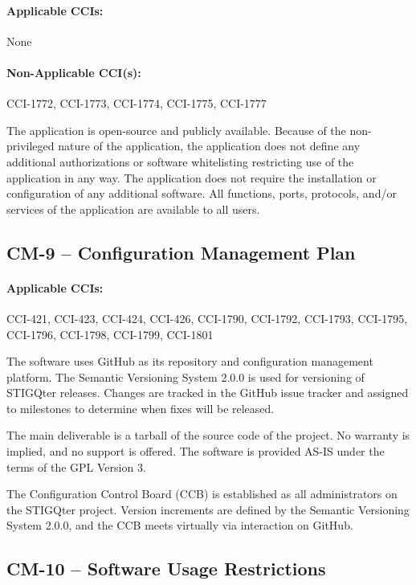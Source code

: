 \documentclass[letterpaper, 10pt, twoside]{article}
\begin{document}
\paragraph{Applicable CCIs:} None

\paragraph{Non-Applicable CCI(s):} CCI-1772, CCI-1773, CCI-1774, CCI-1775, CCI-1777

The application is open-source and publicly available. Because of the non-privileged nature of the application, the application does not define any additional authorizations or software whitelisting restricting use of the application in any way. The application does not require the installation or configuration of any additional software. All functions, ports, protocols, and/or services of the application are available to all users.

\subsection{CM-9 -- Configuration Management Plan}

\paragraph{Applicable CCIs:} CCI-421, CCI-423, CCI-424, CCI-426, CCI-1790, CCI-1792, CCI-1793, CCI-1795, CCI-1796, CCI-1798, CCI-1799, CCI-1801

The software uses GitHub as its repository and configuration management platform. The Semantic Versioning System 2.0.0 is used for versioning of STIGQter releases.\autocite{preston2013semantic} Changes are tracked in the GitHub issue tracker and assigned to milestones to determine when fixes will be released.

The main deliverable is a tarball of the source code of the project. No warranty is implied, and no support is offered. The software is provided AS-IS under the terms of the GPL Version 3.

The Configuration Control Board (CCB) is established as all administrators on the STIGQter project. Version increments are defined by the Semantic Versioning System 2.0.0, and the CCB meets virtually via interaction on GitHub.

\subsection{CM-10 -- Software Usage Restrictions}
\end{document}
